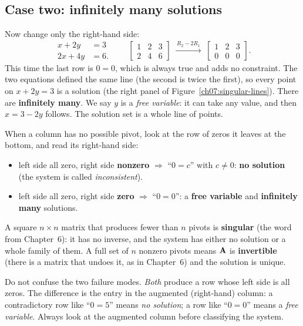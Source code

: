 \subsection{Case two: infinitely many solutions}

Now change only the right-hand side:
\[
\begin{aligned}
x + 2y &= 3\\
2x + 4y &= 6.
\end{aligned}
\qquad
\left[\begin{array}{cc|c}
1 & 2 & 3\\
2 & 4 & 6
\end{array}\right]
\;\xrightarrow{\,R_2 - 2R_1\,}\;
\left[\begin{array}{cc|c}
1 & 2 & 3\\
0 & 0 & 0
\end{array}\right].
\]
This time the last row is $0 = 0$, which is always true and adds no constraint.
The two equations defined the same line (the second is twice the first),
so every point on $x + 2y = 3$ is a solution (the right panel of
Figure~\ref{ch07:singular-lines}). There are \textbf{infinitely
many}. We say $y$ is a \emph{free variable}: it can take any value, and then $x =
3 - 2y$ follows. The solution set is a whole line of points.

\begin{focusbox}
When a column has no possible pivot, look at the row of zeros it leaves at the
bottom, and read its right-hand side:
\begin{itemize}
  \item left side all zero, right side \textbf{nonzero} $\Rightarrow$ ``$0 =
  c$'' with $c\neq 0$: \textbf{no solution} (the system is called \emph{inconsistent}).
  \item left side all zero, right side \textbf{zero} $\Rightarrow$ ``$0 = 0$'':
  a \textbf{free variable} and \textbf{infinitely many} solutions.
\end{itemize}
A square $n\times n$ matrix that produces fewer than $n$ pivots is
\textbf{singular} (the word from Chapter~6):
it has no inverse, and the system has either no solution or a whole family of them.
A full set of $n$ nonzero pivots means $\mathbf{A}$ is \textbf{invertible} (there is
a matrix that undoes it, as in Chapter~6) and the
solution is unique.
\end{focusbox}

\begin{trapbox}
Do not confuse the two failure modes. \emph{Both} produce a row whose left side
is all zeros. The difference is the entry in the augmented (right-hand) column: a
contradictory row like ``$0=5$'' means \emph{no solution}; a row like
``$0=0$'' means a \emph{free variable}. Always look at the augmented
column before classifying the system.
\end{trapbox}

